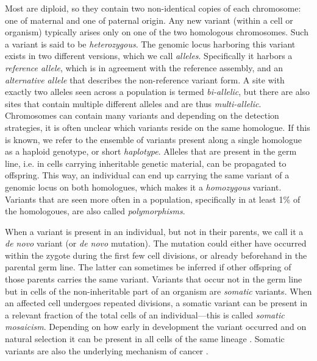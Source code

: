 Most  are diploid, so they contain two non-identical
copies of each chromosome: one of maternal and one of paternal origin. Any new
variant (within a cell or organism) typically arises only on one of the two
homologous chromosomes. Such a variant is said to be \emph{heterozygous}. The
genomic locus harboring this variant exists in two different versions, which we
call \emph{alleles}. Specifically it harbors a \emph{reference allele}, which is
in agreement with the reference assembly, and
an \emph{alternative allele} that describes the non-reference variant form. A
site with exactly two alleles seen across a population is termed
\emph{bi-allelic}, but there are also sites that contain multiple different
alleles and are thus \emph{multi-allelic}. Chromosomes can contain many variants
and depending on the detection strategies, it is often unclear which variants
reside on the same homologue. If this is known, we refer to the ensemble of
variants present along a single homologue as a haploid genotype, or short
\emph{haplotype}. Alleles that are present in the germ line, i.e. in cells
carrying inheritable genetic material, can be propagated to offspring. This way,
an individual can end up carrying the same variant of a genomic locus on both
homologues, which makes it a \emph{homozygous} variant. Variants that are seen
more often in a population, specifically in at least 1\% of the homologoues,
are also called \emph{polymorphisms}.

When a variant is present in an individual, but not in their parents, we call it
a \emph{de novo} variant (or \emph{de novo} mutation). The mutation could
either have occurred within the
zygote during the first few cell divisions, or already beforehand in the
parental germ line. The latter can sometimes be inferred if other offspring of
those parents carries the same variant. Variants that occur not in the germ line
but in cells of the non-inheritable part of an organism are \emph{somatic}
variants. When an affected cell undergoes repeated divisions, a somatic variant
can be present in a relevant fraction of the total cells of an individual---this
is called \emph{somatic mosaicism}. Depending on how early in development the
variant occurred and on natural selection it can be present in all cells of the
same lineage \citep{Youssoufian2002}. Somatic variants are also the underlying
mechanism of cancer \citep{Campbell2007}.


